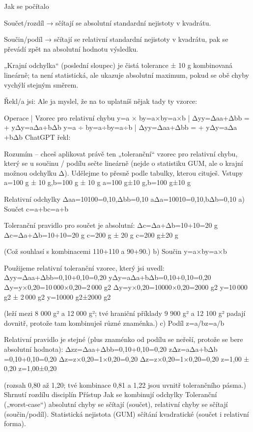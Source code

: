 {Jak se počítalo

    Součet/rozdíl → sčítají se absolutní standardní nejistoty v kvadrátu.

    Součin/podíl → sčítají se relativní standardní nejistoty v kvadrátu, pak se převádí zpět na absolutní hodnotu výsledku.

    „Krajní odchylka“ (poslední sloupec) je čistá tolerance ± 10 g kombinovaná lineárně; ta není statistická, ale ukazuje absolutní maximum, pokud se obě chyby vychýlí stejným směrem.

Řekl/a jsi:
Ale ja myslel, že na to uplatníš nějak tady ty vzorce:

Operace | Vzorec pro relativní chybu
y=a  ×  by=a\;×\;by=a×b | Δyy=Δaa+Δbb\displaystyle {} =  + yΔy​=aΔa​+bΔb​
y=a  ÷  by=a\;÷\;by=a÷b | Δyy=Δaa+Δbb\displaystyle {} =  + yΔy​=aΔa​+bΔb​
ChatGPT řekl:

Rozumím – chceš aplikovat právě ten „toleranční“ vzorec pro relativní chybu, který se u součinu / podílu sečte lineárně (nejde o statistiku GUM, ale o krajní možnou odchylku Δ). Udělejme to přesně podle tabulky, kterou cituješ.
Vstupy
a=100 g  ±  10 g,b=100 g  ±  10 g
a=100 g±10 g,b=100 g±10 g

Relativní odchylky
Δaa=10100=0,10,Δbb=0,10
aΔa​=10010​=0,10,bΔb​=0,10
a) Součet c=a+bc=a+b

Toleranční pravidlo pro součet je absolutní:
Δc=Δa+Δb=10+10=20 g
Δc=Δa+Δb=10+10=20 g
c=200 g  ±  20 g
c=200 g±20 g​

(Což souhlasí s kombinacemi 110+110 a 90+90.)
b) Součin y=a×by=a×b

Použijeme relativní toleranční vzorec, který jsi uvedl:
Δyy=Δaa+Δbb=0,10+0,10=0,20
yΔy​=aΔa​+bΔb​=0,10+0,10=0,20
Δy=y×0,20=10 000×0,20=2 000 g2
Δy=y×0,20=10000×0,20=2000 g2
y=10 000 g2  ±  2 000 g2
y=10000 g2±2000 g2​

(leží mezi 8 000 g² a 12 000 g²; tvé hraniční příklady 9 900 g² a 12 100 g² padají dovnitř, protože tam kombinuješ různé znaménka.)
c) Podíl z=a/bz=a/b

Relativní pravidlo je stejné (plus znaménko od podílu se neřeší, protože se bere absolutní hodnota):
Δzz=Δaa+Δbb=0,10+0,10=0,20
zΔz​=aΔa​+bΔb​=0,10+0,10=0,20
Δz=z×0,20=1×0,20=0,20
Δz=z×0,20=1×0,20=0,20
z=1,00  ±  0,20
z=1,00±0,20​

(rozsah 0,80 až 1,20; tvé kombinace 0,81 a 1,22 jsou uvnitř tolerančního pásma.)
Shrnutí rozdílu disciplín
Přístup	Jak se kombinují odchylky
Toleranční („worst‑case“)	absolutní chyby se sčítají (součet), relativní chyby se sčítají (součin/podíl).
Statistická nejistota (GUM)	sčítání kvadratické (součet i relativní forma).

}
